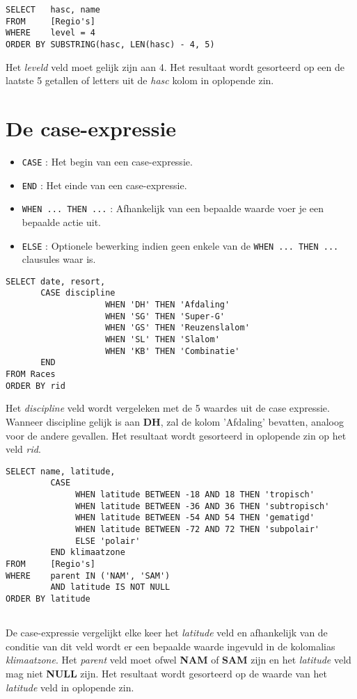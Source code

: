 \documentclass[12pt]{report}
\newcommand{\sepline}{ \noindent{\rule{\linewidth}{0.4pt}}}
\begin{document}
\sepline

\begin{verbatim}
SELECT   hasc, name
FROM     [Regio's]
WHERE    level = 4
ORDER BY SUBSTRING(hasc, LEN(hasc) - 4, 5)
\end{verbatim}
Het \textit{leveld} veld moet gelijk zijn aan 4. Het resultaat wordt gesorteerd op een de laatste 5 getallen of letters uit de 
\textit{hasc} kolom in oplopende zin.

\section{De case-expressie}
\begin{itemize}
 \item \texttt{CASE} : Het begin van een case-expressie.
 \item \texttt{END} : Het einde van een case-expressie.
 \item \texttt{WHEN ... THEN ...} : Afhankelijk van een bepaalde waarde voer je een bepaalde actie uit.
 \item \texttt{ELSE} : Optionele bewerking indien geen enkele van de \texttt{WHEN ... THEN ...} clausules waar is.
\end{itemize}

\begin{verbatim}
SELECT date, resort,
       CASE discipline
	                WHEN 'DH' THEN 'Afdaling'
	                WHEN 'SG' THEN 'Super-G'
	                WHEN 'GS' THEN 'Reuzenslalom'
	                WHEN 'SL' THEN 'Slalom'
	                WHEN 'KB' THEN 'Combinatie'
       END
FROM Races
ORDER BY rid
\end{verbatim}
Het \textit{discipline} veld wordt vergeleken met de 5 waardes uit de case expressie. Wanneer discipline gelijk is 
aan \textbf{DH}, zal de kolom 'Afdaling' bevatten, analoog voor de andere gevallen. Het resultaat
wordt gesorteerd in oplopende zin op het veld \textit{rid}.

\sepline

\begin{verbatim}
SELECT name, latitude,
         CASE 
	          WHEN latitude BETWEEN -18 AND 18 THEN 'tropisch'
	          WHEN latitude BETWEEN -36 AND 36 THEN 'subtropisch'
	          WHEN latitude BETWEEN -54 AND 54 THEN 'gematigd'
	          WHEN latitude BETWEEN -72 AND 72 THEN 'subpolair'
	          ELSE 'polair'
         END klimaatzone
FROM     [Regio's]
WHERE    parent IN ('NAM', 'SAM')
         AND latitude IS NOT NULL
ORDER BY latitude
    
\end{verbatim}
De case-expressie vergelijkt elke keer het \textit{latitude} veld en afhankelijk van de conditie van dit veld
wordt er een bepaalde waarde ingevuld in de kolomalias \textit{klimaatzone}. Het \textit{parent} veld moet ofwel
\textbf{NAM} of \textbf{SAM} zijn en het \textit{latitude} veld mag niet \textbf{NULL} zijn. Het resultaat 
wordt gesorteerd op de waarde van het \textit{latitude} veld in oplopende zin.
\end{document}
